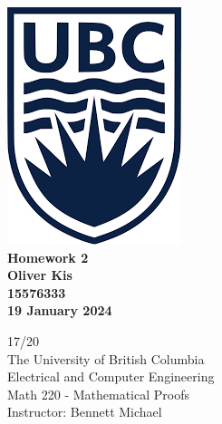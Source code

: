 \documentclass[letterpaper, 12pt]{article}
\newcommand{\myname}{Oliver Kis}
\newcommand{\mystudentnumber}{15576333}
\newcommand{\hw}{2} %
\newcommand{\dates}{19 January 2024}
\theoremstyle{definition}
\begin{document}
\begin{titlepage}
\centering
    \includegraphics{UBC.png}\\
    \vspace{1cm}
    {\bfseries\large
    Homework \hw \\
    \vspace{0.5cm}
    \myname\\
    \vspace{0.5cm}
    \mystudentnumber\\
    \vspace{0.5cm}
    \dates\\  %
    }
    
    \vfill
    {\large
    17/20\\
    \vspace{0.25cm}
    The University of British Columbia\\
    \vspace{0.25cm}
    Electrical and Computer Engineering\\
    \vspace{0.25cm}
    Math 220 - Mathematical Proofs\\
    \vspace{0.25cm}
    Instructor: Bennett Michael\\
    }


\end{titlepage}
\end{document}
